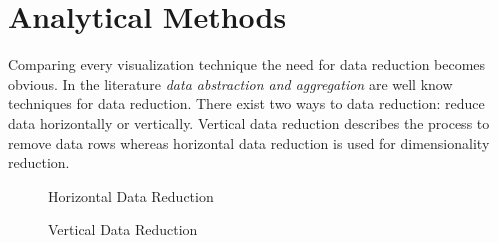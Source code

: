 \section{Analytical Methods}
Comparing every visualization technique the need for data reduction becomes obvious. In the literature \textit{data abstraction and aggregation} are well know techniques for data reduction\cite{FerreiradeOliveira2003,Aigner2011, Keim2005}. There exist two ways to data reduction: reduce data horizontally or vertically. 
Vertical data reduction describes the process to remove data rows whereas horizontal data reduction is used for dimensionality reduction. 
\begin{figure}[H]
    \centering
    \caption{Horizontal Data Reduction}
    \label{fig:my_label}
\end{figure}

\begin{figure}[H]
    \centering
    \caption{Vertical Data Reduction}
    \label{fig:my_label}
\end{figure}

